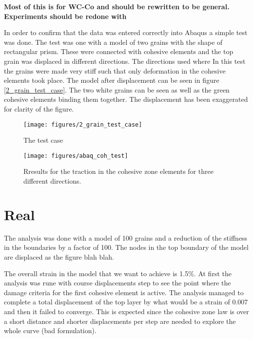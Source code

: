 \documentclass[wcco.tex]{subfiles}
\begin{document}
\textbf{Most of this is for WC-Co and should be rewritten to be general. Experiments should be redone with }

In order to confirm that the data was entered correctly into Abaqus a simple test was done. The test was one with a model of two grains with the shape of rectangular prism. These were connected with cohesive elements and the top grain was displaced in different directions. The directions used where  In this test the grains were made very stiff such that only deformation in the cohesive elements took place. The model after displacement can be seen in figure \ref{2_grain_test_case}. The two white grains can be seen as well as the green cohesive elements binding them together. The displacement has been exaggerated for clarity of the figure.

\begin{figure}[ht]
\centering
\texttt{[image: figures/2\_grain\_test\_case]}
\caption{The test case}
\label{fig:test_case}
\end{figure}


\begin{figure}[ht]
\centering
\texttt{[image: figures/abaq\_coh\_test]}
\caption{Rresults for the traction in the cohesive zone elements for three different directions.}
\label{fig:test_case}
\end{figure}

\section{Real}
The analysis was done with a model of 100 grains and a reduction of the stiffness in the boundaries by a factor of 100. The nodes in the top boundary of the model are displaced as the figure blah blah.

The overall strain in the model that we want to achieve is 1.5\%. At first the analysis was rune with course displacements step to see the point where the damage criteria for the first cohesive element is active. The analysis managed to complete a total displacement of the top layer by what would be a strain of 0.007 and then it failed to converge. This is expected since the cohesive zone law is over a short distance and shorter displacements per step are needed to explore the whole curve (bad formulation).
\end{document}
